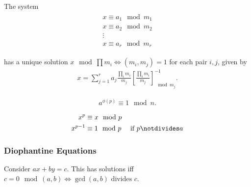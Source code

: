 \begin{theorem}

The system
\begin{align*}
\begin{array} { c } { x \equiv a _ { 1 }   \mod m _ { 1 }  } \\ { x \equiv a _ { 2 }   \mod m _ { 2 }  } \\ { \vdots } \\ { x \equiv a _ { r }   \mod m _ { r }  } \end{array}
\end{align*}

has a unique solution \(x \mod \prod m_i \iff (m_i, m_j) = 1\) for each
pair \(i,j\), given by
\begin{align*}  
x = \sum_{j=1}^r a_j \frac{\prod_i m_i}{m_j} \left[ \frac{\prod_i m_i}{m_j} \right]^{-1}_{\mod m_j}
.\end{align*}

\end{theorem}

\begin{theorem}

\begin{align*}  
a^{\phi(p)} \equiv 1 \mod n
.\end{align*}

\end{theorem}

\begin{theorem}

\begin{align*}
x^{p}  &\equiv x \mod p \\
x^{p-1} &\equiv 1 \mod p \quad \text{ if } p \notdivides a
\end{align*}

\end{theorem}

\hypertarget{diophantine-equations}{%
\subsubsection{Diophantine Equations}\label{diophantine-equations}}

\begin{proposition}

Consider \(ax + by = c\). This has solutions iff
\(c = 0 \mod (a,b) \iff \gcd(a,b) \text{ divides } c\).


\end{proposition}

